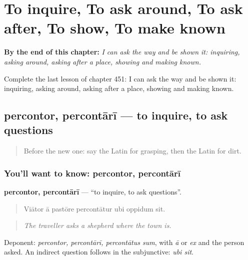 
\chapter{To inquire, To ask around, To ask after, To show, To make known}
\label{ch:la-to-inquire-to-ask-around-to-ask-after-to-show-to-make-known}

\begin{chapteropening}
\textbf{By the end of this chapter:} \emph{I can ask the way and be shown it: inquiring, asking around, asking after a place, showing and making known.}

Complete the last lesson of chapter 451: I can ask the way and be shown it: inquiring, asking around, asking after a place, showing and making known.
\end{chapteropening}

\section[percontor, percontārī]{percontor, percontārī — to inquire, to ask questions}

\label{lesson:LA-C451-percontor}



\begin{quote}
Before the new one: say the Latin for grasping, then the Latin for dirt.
\end{quote}

\subsection*{You'll want to know: percontor, percontārī}
\textbf{percontor, percontārī} — \textquotedblleft{}to inquire, to ask questions\textquotedblright{}.

\begin{quote}
Viātor ā pastōre percontātur ubi oppidum sit.
\end{quote}

\begin{quote}
\emph{The traveller asks a shepherd where the town is.}
\end{quote}

Deponent: \emph{percontor, percontārī, percontātus sum}, with \emph{ā} or \emph{ex} and the person asked. An indirect question follows in the subjunctive: \emph{ubi sit}.

